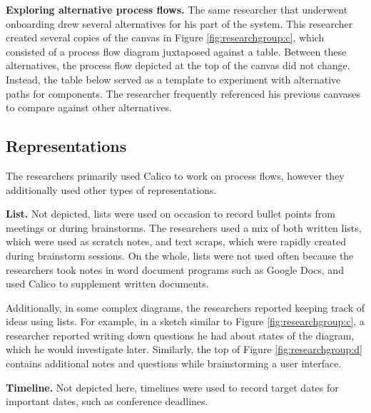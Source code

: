 \textbf{Exploring alternative process flows.} The same researcher that underwent onboarding drew several alternatives for his part of the system. This researcher created several copies of the canvas in Figure \ref{fig:researchgroup:c}, which consisted of a process flow diagram juxtaposed against a table. Between these alternatives, the process flow depicted at the top of the canvas did not change. Instead, the table below served as a template to experiment with alternative paths for components. The researcher frequently referenced his previous canvases to compare against other alternatives.




\subsection{Representations}

The researchers primarily used Calico to work on process flows, however they additionally used other types of representations.

\textbf{List. }  Not depicted, lists were used on occasion to record bullet points from meetings or during brainstorms. The researchers used a mix of both written lists, which were used as scratch notes, and text scraps, which were rapidly created during brainstorm sessions. On the whole, lists were not used often because the researchers took notes in word document programs such as Google Docs, and used Calico to supplement written documents.

Additionally, in some complex diagrams, the researchers reported keeping track of ideas using lists. For example, in a sketch similar to Figure \ref{fig:researchgroup:c}, a researcher reported writing down questions he had about states of the diagram, which he would investigate later. Similarly, the top of Figure \ref{fig:researchgroup:d} contains additional notes and questions while brainstorming a user interface.


\textbf{Timeline. } Not depicted here, timelines were used to record target dates for important dates, such as conference deadlines.

